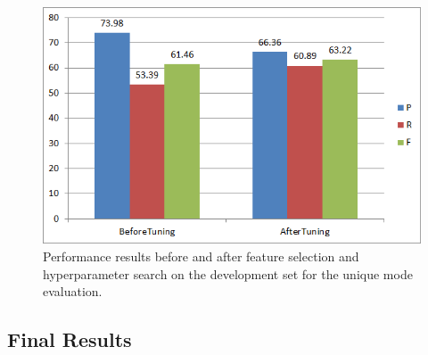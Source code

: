 \begin{figure}
\centering
\includegraphics[scale=0.6]{figures/SSModelRegPar.png}
\caption{Performance results before and after feature selection and hyperparameter search on the development set for the unique mode evaluation.}\label{fig:SSModelRegPar} %
\end{figure}

\subsection{Final Results}\label{subsec:SSFinalRes}

